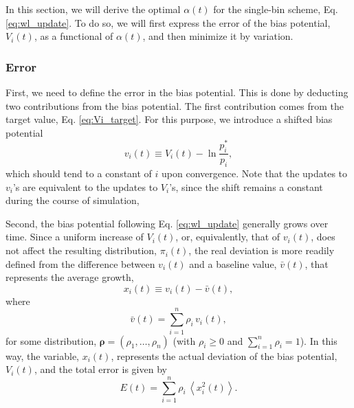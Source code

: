 \documentclass[reprint, superscriptaddress, floatfix]{revtex4-1}
\newcommand{\Err}{E}
\begin{document}
In this section,
we will derive the optimal $\alpha(t)$
for the single-bin scheme,
Eq. \eqref{eq:wl_update}.
%
To do so,
we will first express the error of
the bias potential, $V_i(t)$,
as a functional of $\alpha(t)$,
and then minimize it by variation.



\subsubsection{Error}



First, we need to define the error in the bias potential.
%
This is done by deducting two contributions from the bias potential.
%
The first contribution comes from the target value,
Eq. \eqref{eq:Vi_target}.
%
For this purpose,
we introduce a shifted bias potential
%
\begin{equation}
  v_i(t)
  \equiv
  V_i(t)
  -
  \ln \frac { p^*_i }
            { p_i }
  ,
  \label{eq:v_def}
\end{equation}
%
which should tend to a constant of $i$
upon convergence.
Note that the updates to $v_i$'s are
equivalent to the updates to $V_i$'s,
since the shift
remains a constant during the course of simulation,


Second, the bias potential following Eq. \eqref{eq:wl_update}
generally grows over time.
%
Since a uniform increase of $V_i(t)$, or, equivalently, that of $v_i(t)$,
does not affect the
resulting distribution, $\pi_i(t)$,
%
the real deviation is more readily defined
from the difference between $v_i(t)$ and a baseline value, $\bar v(t)$,
that represents the average growth\cite{
dama2014},
%
\begin{equation}
  x_i(t) \equiv v_i(t) - \bar v(t)
  ,
\label{eq:x_def}
\end{equation}
%
where
%
\begin{equation}
  \bar v(t)
  = \sum_{i = 1}^n \rho_i \, v_i(t)
  ,
\label{eq:vbar_def}
\end{equation}
for some distribution,
$\pmb \rho = (\rho_1, \dots, \rho_n)$
(with $\rho_i \ge 0$ and $\sum_{i = 1}^n \rho_i = 1$).
%
In this way,
the variable, $x_i(t)$,
represents the actual deviation of the bias potential, $V_i(t)$,
and the total error is given by
%
\begin{equation}
  \Err(t)
  =
  \sum_{i = 1}^n \rho_i \, \left\langle x_i^2(t) \right\rangle
  .
\label{eq:error_sum}
\end{equation}
\end{document}
